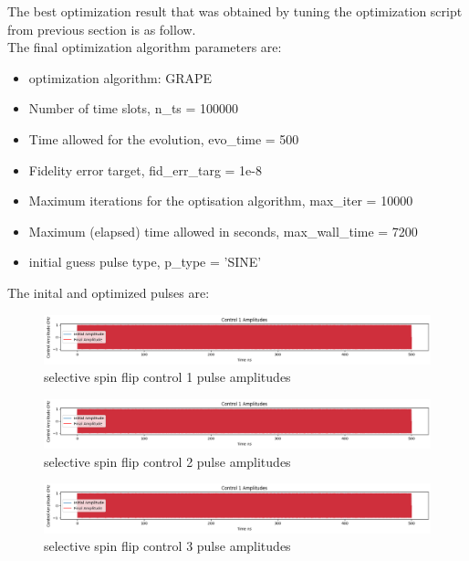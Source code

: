 \documentclass[12pt]{article}
\begin{document}
The best optimization result that was obtained by tuning the optimization script from 
previous section is as follow. 
\\
The final optimization algorithm parameters are:
\\ 
\begin{itemize}
    \item optimization algorithm: GRAPE
    \item Number of time slots, n\_ts = 100000
    \item Time allowed for the evolution, evo\_time = 500
    \item Fidelity error target, fid\_err\_targ = 1e-8
    \item Maximum iterations for the optisation algorithm, max\_iter = 10000
    \item Maximum (elapsed) time allowed in seconds, max\_wall\_time = 7200
    \item initial guess pulse type, p\_type = 'SINE'
\end{itemize}

The inital and optimized pulses are: 
\begin{figure}[H]
    \centering
    \includegraphics[width=0.95\linewidth]{selective_spin_flip_GRAPE_control1.png}
    \caption{selective spin flip control 1 pulse amplitudes}
    \label{fig:selective_spin_flip_control1}
\end{figure}
\begin{figure}[H]
    \centering
    \includegraphics[width=0.95\linewidth]{selective_spin_flip_GRAPE_control1.png}
    \caption{selective spin flip control 2 pulse amplitudes}
    \label{fig:selective_spin_flip_control2}
\end{figure}
\begin{figure}[H]
    \centering
    \includegraphics[width=0.95\linewidth]{selective_spin_flip_GRAPE_control1.png}
    \caption{selective spin flip control 3 pulse amplitudes}
    \label{fig:selective_spin_flip_control3}
\end{figure}
\end{document}
